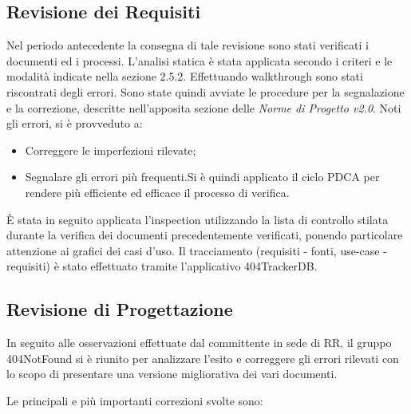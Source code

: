 \subsection{Revisione dei Requisiti}
Nel periodo antecedente la consegna di tale revisione sono stati verificati i documenti ed i processi.
L'analisi statica è stata applicata secondo i criteri e le modalità indicate nella sezione 2.5.2. Effettuando walkthrough sono stati riscontrati degli errori. Sono state quindi avviate le procedure per la segnalazione e la correzione, descritte nell'apposita sezione delle \textit{Norme di Progetto v2.0}.
Noti gli errori, si è provveduto a:
\begin{itemize}
	\item Correggere le imperfezioni rilevate;
	\item Segnalare gli errori più frequenti.Si è quindi applicato il ciclo PDCA per rendere più efficiente ed efficace il processo di verifica.
\end{itemize}
È stata in seguito applicata l'inspection utilizzando la lista di controllo stilata durante la verifica dei documenti precedentemente verificati, ponendo particolare attenzione ai grafici dei casi d'uso.
Il tracciamento (requisiti - fonti, use-case - requisiti) è stato effettuato tramite l'applicativo 404TrackerDB.
\newpage
\subsection{Revisione di Progettazione}
In seguito alle osservazioni effettuate dal committente in sede di RR, il gruppo 404NotFound si è riunito per analizzare l'esito e correggere gli errori rilevati con lo scopo di presentare una versione migliorativa dei vari documenti.

Le principali e più importanti correzioni svolte sono:

